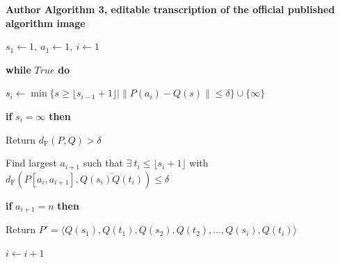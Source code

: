 \par\medskip\noindent\textbf{Author Algorithm 3, editable transcription of the official published algorithm image}\par
{}\quad $s_1\leftarrow 1,\ a_1\leftarrow 1,\ i\leftarrow 1$\par
{}\quad \textbf{while} $True$ \textbf{do}\par
{}\quad\quad $s_i\leftarrow\min\{s\geq\lfloor s_{i-1}+1\rfloor\mid\|P(a_i)-Q(s)\|\leq\delta\}\cup\{\infty\}$\par
{}\quad\quad \textbf{if} $s_i=\infty$ \textbf{then}\par
{}\quad\quad\quad Return $d_{\mathrm F}(P,Q)>\delta$\par
{}\quad\quad Find largest $a_{i+1}$ such that $\exists\ t_i\leq\lfloor s_i+1\rfloor$ with $d_{\mathrm F}(P[a_i,a_{i+1}],\overline{Q(s_i)Q(t_i)})\leq\delta$\par
{}\quad\quad \textbf{if} $a_{i+1}=n$ \textbf{then}\par
{}\quad\quad\quad Return $P'=\langle Q(s_1),Q(t_1),Q(s_2),Q(t_2),\ldots,Q(s_i),Q(t_i)\rangle$\par
{}\quad\quad $i\leftarrow i+1$\par
